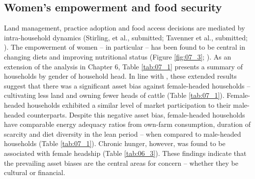 \subsection{Women's empowerment and food security}
Land management, practice adoption and food access decisions are mediated by intra-household dynamics (Stirling, et al., submitted; Tavenner et al., submitted; \citealp{Dzanku2019, Price2018, AnderssonDjurfeldt2018a, Haider2018, Kazianga2017, Galie2015}). The empowerment of women -- in particular -- has been found to be central in changing diets and improving nutritional status (Figure \ref{fig:07_3}; \citealp{Rao2018, Price2018, Jaenicke2013}). As an extension of the analysis in Chapter 6, Table \ref{tab:07_1} presents a summary of households by gender of household head. In line with \citet{AnderssonDjurfeldt2018a}, these extended results suggest that there was a significant asset bias against female-headed households -- cultivating less land and owning fewer heads of cattle (Table \ref{tab:07_1}). Female-headed households exhibited a similar level of market participation to their male-headed counterparts. Despite this negative asset bias, female-headed households have comparable energy adequacy ratios from own-farm consumption, duration of scarcity and diet diversity in the lean period -- when compared to male-headed households (Table \ref{tab:07_1}). Chronic hunger, however, was found to be associated with female headship (Table \ref{tab:06_3}).
These findings indicate that the prevailing asset biases are the central areas for concern -- whether they be cultural or financial.

